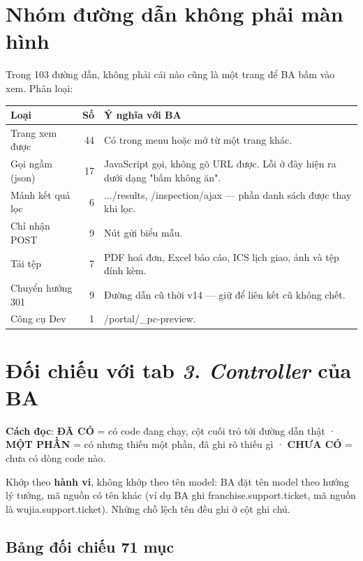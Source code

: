 \documentclass[11pt,a4paper]{report}
\newcommand{\ok}{\textcolor{okc}{\textbf{ĐÃ CÓ}}}
\newcommand{\pt}{\textcolor{partc}{\textbf{MỘT PHẦN}}}
\newcommand{\no}{\textcolor{noc}{\textbf{CHƯA CÓ}}}
\newcommand{\rt}[1]{{\ttfamily\footnotesize #1}}
\begin{document}
\chapter{Nhóm đường dẫn không phải màn hình}

Trong 103 đường dẫn, không phải cái nào cũng là một trang để BA bấm vào xem. Phân loại:

\begin{center}
\small
\begin{tabular}{@{}lrL{8.6cm}@{}}
\toprule
\textbf{Loại} & \textbf{Số} & \textbf{Ý nghĩa với BA} \\
\midrule
Trang xem được & 44 & Có trong menu hoặc mở từ một trang khác. \\
Gọi ngầm (\rt{json}) & 17 & JavaScript gọi, không gõ URL được. Lỗi ở đây hiện ra dưới dạng "bấm không ăn". \\
Mảnh kết quả lọc & 6 & \rt{.../results}, \rt{/inspection/ajax} — phần danh sách được thay khi lọc. \\
Chỉ nhận POST & 9 & Nút gửi biểu mẫu. \\
Tải tệp & 7 & PDF hoá đơn, Excel báo cáo, ICS lịch giao, ảnh và tệp đính kèm. \\
Chuyển hướng 301 & 9 & Đường dẫn cũ thời v14 — giữ để liên kết cũ không chết. \\
Công cụ Dev & 1 & \rt{/portal/\_pc-preview}. \\
\bottomrule
\end{tabular}
\end{center}

\chapter{Đối chiếu với tab \textit{3. Controller} của BA}

\textbf{Cách đọc}: \ok{} = có code đang chạy, cột cuối trỏ tới đường dẫn thật ·
\pt{} = có nhưng thiếu một phần, đã ghi rõ thiếu gì · \no{} = chưa có dòng code nào.

Khớp theo \textbf{hành vi}, không khớp theo tên model: BA đặt tên model theo hướng lý tưởng,
mã nguồn có tên khác (ví dụ BA ghi \rt{franchise.support.ticket}, mã nguồn là
\rt{wujia.support.ticket}). Những chỗ lệch tên đều ghi ở cột ghi chú.

\section{Bảng đối chiếu 71 mục}
\end{document}
